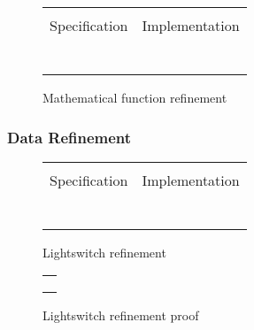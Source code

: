 \begin{figure}
  \centering
  \begin{tabular}[c]{c|c}
    \hline \\
    Specification & Implementation \\
    \hline\hline \\ \\
    \begin{subfigure}[c]{0.5\textwidth}
     
      \label{fig:prepost1}
    \end{subfigure}
    &
    \begin{subfigure}[c]{0.5\textwidth}
      
      \label{fig:prepost2}
    \end{subfigure}
    \\ \\
    \hline
  \end{tabular}    
  \caption{Mathematical function refinement}
  \label{fig:prepost}
\end{figure}

\subsubsection{Data Refinement}

\begin{figure}
  \centering
  \begin{tabular}[c]{c|c}
    \hline \\
    Specification & Implementation \\
    \hline\hline \\ \\
    \begin{subfigure}[c]{0.5\textwidth}
     
      \label{fig:lightswitch1}
    \end{subfigure}
    &
    \begin{subfigure}[c]{0.5\textwidth}
      
      \label{fig:lightswicth2}
    \end{subfigure}
    \\ \\
    \hline
  \end{tabular}    
  \caption{Lightswitch refinement}
  \label{fig:lightswitch}
\end{figure}

\begin{figure}
\centering
\begin{tabular}{c}
\hline \\
 \\ \\
\hline
\end{tabular}
\caption{Lightswitch refinement proof}
\label{fig:lightswitch3}
\end{figure}
